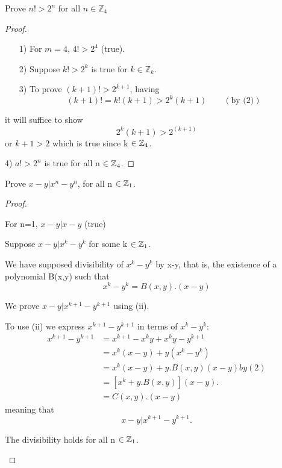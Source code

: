 \documentclass[11pt]{amsbook}
\begin{document}
  \begin{exmp}
    Prove $n!>2^n$ for all $n \in \mathbb{Z}_4$
  \end{exmp}
  \begin{proof}
    \begin{enumerate}
      \item[1)] For $m=4$, $4!>2^4$ \qquad (true).
      \item[2)] Suppose $k!>2^k$ is true for $k \in \mathbb{Z}_k$.
      \item[3)] To prove $(k+1)!>2^{k+1}$, having
      \[
      (k+1)!=k!(k+1)>2^k (k+1) \qquad (\mbox{by (2)})
      \]
    \end{enumerate}
it will suffice to show
\[
	2^k (k+1) > 2^{(k+1)}
\]
or $ k+1>2 $ which is true since k $\in \mathbb{Z}_{4}$.

4) $a! > 2^n$ is true for all n $\in \mathbb{Z}_{4}$.
  \end{proof}
\begin{exmp}
Prove  $ x-y|x^n-y^n $, for all n $\in \mathbb{Z}_{1}$.
\begin{proof}
\begin{hEnumerateRoman}
\item For n=1, $ x-y|x-y $ (true)
\item Suppose $x-y|x^k-y^k$ for some k $\in \mathbb{Z}_{1}$.

We have supposed divisibility of $x^k-y^k$ by x-y, that is, the existence
of a polynomial B(x,y) such that
\[
	x^k - y^k = B(x,y).(x-y)
\]
\item We prove $x-y|x^{k+1}-y^{k+1}$ using (ii).

To use (ii) we express $x^{k+1}-y^{k+1}$ in terms of $x^k-y^k$:
\begin{align}
x^{k+1}-y^{k+1} &= x^{k+1} - x^ky + x^ky - y^{k+1}  \\
&= x^k(x-y) + y(x^k-y^k) \\
&= x^k(x-y) + y.B(x,y)(x-y)       by(2) \\
&= [x^k + y.B(x,y)] (x-y). \\
&= C(x,y).(x-y)
\end{align}
meaning that
\[
	x-y | x^{k+1}-y^{k+1}.
\]
\item The divisibility holds for all n $\in \mathbb{Z}_{1}$.

\end{hEnumerateRoman}
\end{proof}
\end{exmp}
\end{document}
